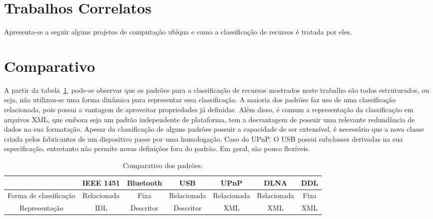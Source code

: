 \section{Trabalhos Correlatos}
Apresenta-se a seguir alguns projetos de computação ubíqua e como a classificação de recursos é tratada por eles.






\section{Comparativo}
A partir da tabela~\ref{tab:comparativo}, pode-se observar que os padrões para a classificação de recursos mostrados neste trabalho são todos estruturados, ou seja, não utilizou-se uma forma dinâmica para representar essa classificação. A maioria dos padrões faz uso de uma classificação relacionada, pois possui a vantagem de aproveitar propriedades já definidas. Além disso, é comum a representação da classificação em arquivos XML, que embora seja um padrão independente de plataforma, tem a desvantagem de possuir uma relevante redundância de dados na sua formatação. Apesar da classificação de alguns padrões possuir a capacidade de ser extensível, é necessário que a nova classe criada pelos fabricantes de um dispositivo passe por uma homologação. Caso do UPnP. O USB possui subclasses derivadas na sua especificação, entretanto não permite novas definições fora do padrão. Em geral, são pouco flexíveis. 

\begin{table}
	\caption{Comparativo dos padrões.}
	\begin{center}
	\resizebox{16cm}{!} {
		\begin{tabular}{ccccccc}
		\hline
							& \textbf{IEEE 1451}	& \textbf{Bluetooth} 	& \textbf{USB}	& \textbf{UPnP} & \textbf{DLNA} & \textbf{DDL}\\
		\hline
		Forma de classificação 		& Relacionada 			& Fixa 					& Relacionada 	& Relacionada 	& Relacionada 	& Fixa \\
		\hline
		Representação 		& IDL 					& Descritor				& Descritor		& XML			& XML 			& XML \\ 
		\hline
		\end{tabular}
	}
	\end{center}
	\label{tab:comparativo}
\end{table}

